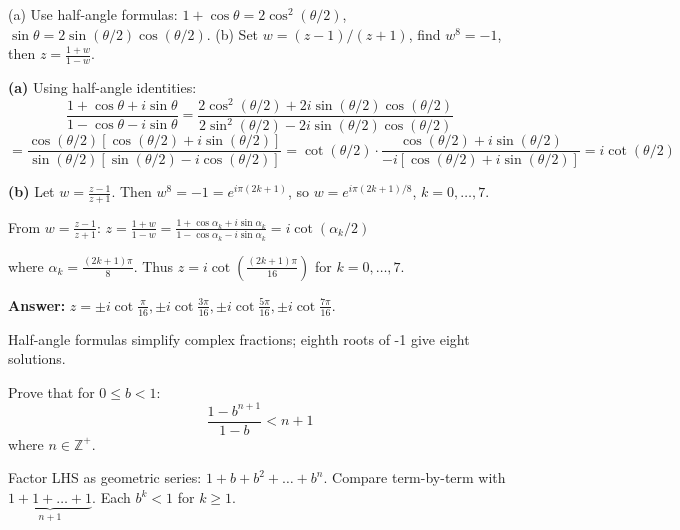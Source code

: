 \vspace{0.5cm}
\begin{hintbox}
(a) Use half-angle formulas: $1+\cos\theta=2\cos^2(\theta/2)$, $\sin\theta=2\sin(\theta/2)\cos(\theta/2)$. (b) Set $w=(z-1)/(z+1)$, find $w^8=-1$, then $z=\frac{1+w}{1-w}$.
\end{hintbox}

\begin{solution}
\textbf{(a)} Using half-angle identities:
$$
\frac{1+\cos\theta+i\sin\theta}{1-\cos\theta-i\sin\theta} = \frac{2\cos^2(\theta/2) + 2i\sin(\theta/2)\cos(\theta/2)}{2\sin^2(\theta/2) - 2i\sin(\theta/2)\cos(\theta/2)}
$$
$$
= \frac{\cos(\theta/2)[\cos(\theta/2) + i\sin(\theta/2)]}{\sin(\theta/2)[\sin(\theta/2) - i\cos(\theta/2)]} = \cot(\theta/2) \cdot \frac{\cos(\theta/2) + i\sin(\theta/2)}{-i[\cos(\theta/2) + i\sin(\theta/2)]} = i\cot(\theta/2)
$$

\textbf{(b)} Let $w = \frac{z-1}{z+1}$. Then $w^8 = -1 = e^{i\pi(2k+1)}$, so $w = e^{i\pi(2k+1)/8}$, $k=0,\ldots,7$.

From $w = \frac{z-1}{z+1}$: $z = \frac{1+w}{1-w} = \frac{1+\cos\alpha_k+i\sin\alpha_k}{1-\cos\alpha_k-i\sin\alpha_k} = i\cot(\alpha_k/2)$

where $\alpha_k = \frac{(2k+1)\pi}{8}$. Thus $z = i\cot(\frac{(2k+1)\pi}{16})$ for $k=0,\ldots,7$.

\textbf{Answer:} $z = \pm i\cot\frac{\pi}{16}, \pm i\cot\frac{3\pi}{16}, \pm i\cot\frac{5\pi}{16}, \pm i\cot\frac{7\pi}{16}$.
\end{solution}

\begin{takeaways}
Half-angle formulas simplify complex fractions; eighth roots of -1 give eight solutions.
\end{takeaways}

\vspace{1cm}

\begin{problem}
Prove that for $0 \le b < 1$:
$$
\frac{1 - b^{n+1}}{1-b} < n+1
$$
where $n \in \mathbb{Z}^+$.
\end{problem}

\vspace{0.5cm}
\begin{hintbox}
Factor LHS as geometric series: $1 + b + b^2 + \dots + b^n$. Compare term-by-term with $\underbrace{1+1+\dots+1}_{n+1}$. Each $b^k < 1$ for $k \ge 1$.
\end{hintbox}

